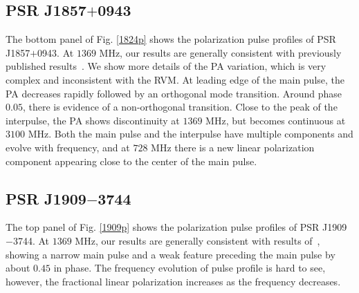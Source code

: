 \documentclass[useAMS,usenatbib]{mn2e}
\begin{document}
\subsection{PSR J1857$+$0943}

The bottom panel of Fig. \ref{1824p} shows the polarization pulse profiles of 
PSR J1857$+$0943.
%
At $1369$ MHz, our results are generally consistent with previously published 
results~\citep{Yan11}.
%
We show more details of the PA variation, which is very complex and inconsistent
with the RVM.
%
At leading edge of the main pulse, the PA decreases rapidly followed by an 
orthogonal mode transition. 
%
Around phase $0.05$, there is evidence of a non-orthogonal transition.
%
Close to the peak of the interpulse, the PA shows discontinuity at $1369$ MHz, 
but becomes continuous at $3100$ MHz.
%
Both the main pulse and the interpulse have multiple components and evolve 
with frequency, and at $728$ MHz there is a new linear polarization component 
appearing close to the center of the main pulse.


\subsection{PSR J1909$-$3744}

The top panel of Fig. \ref{1909p} shows the polarization pulse profiles of 
PSR J1909$-$3744.
%
At $1369$ MHz, our results are generally consistent with results of~\citet{Ord04,Yan11}, 
showing a narrow main pulse and a weak feature preceding the main pulse by 
about $0.45$ in phase.
%
The frequency evolution of pulse profile is hard to see, however, the fractional 
linear polarization increases as the frequency decreases.

\end{document}
